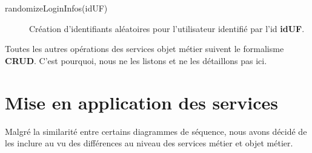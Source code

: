 \begin{description}
  \item[randomizeLoginInfos(idUF)] Création d'identifiants aléatoires pour
    l'utilisateur identifié par l'id \textbf{idUF}.
\end{description}

Toutes les autres opérations des services objet métier suivent le formalisme
\textbf{CRUD}. C'est pourquoi, nous ne les listons et ne les détaillons pas
ici.

\section{Mise en application des services}

Malgré la similarité entre certains diagrammes de séquence, nous avons décidé
de les inclure au vu des différences au niveau des services métier et objet
métier. \\

